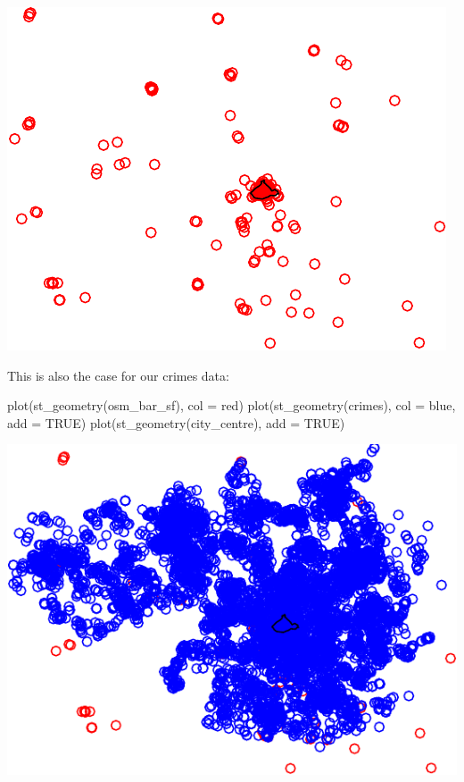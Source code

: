 \documentclass[
]{book}
\makeatletter
\newenvironment{Shaded}{\begin{snugshade}}{\end{snugshade}}
\newcommand{\AttributeTok}[1]{\textcolor[rgb]{0.61,0.61,0.61}{#1}}
\newcommand{\ConstantTok}[1]{\textcolor[rgb]{0,0,0}{#1}}
\newcommand{\FunctionTok}[1]{\textcolor[rgb]{0,0,0}{#1}}
\newcommand{\NormalTok}[1]{#1}
\newcommand{\StringTok}[1]{\textcolor[rgb]{0.5,0.5,0.5}{#1}}
\newenvironment{kframe}{%
\medskip{}
\setlength{\fboxsep}{.8em}
 \def\at@end@of@kframe{}%
 \ifinner\ifhmode%
  \def\at@end@of@kframe{\end{minipage}}%
  \begin{minipage}{\columnwidth}%
 \fi\fi%
 \def\FrameCommand##1{\hskip\@totalleftmargin \hskip-\fboxsep
 \colorbox{shadecolor}{##1}\hskip-\fboxsep
     \hskip-\linewidth \hskip-\@totalleftmargin \hskip\columnwidth}%
 \MakeFramed {\advance\hsize-\width
   \@totalleftmargin\z@ \linewidth\hsize
   \@setminipage}}%
 {\par\unskip\endMakeFramed%
 \at@end@of@kframe}
\renewenvironment{Shaded}{\begin{kframe}}{\end{kframe}}
\makeatother
\begin{document}
\includegraphics{crime_mapping_files/figure-latex/plot_bars-1.pdf}

This is also the case for our crimes data:

\begin{Shaded}
\begin{Highlighting}[]
\FunctionTok{plot}\NormalTok{(}\FunctionTok{st\_geometry}\NormalTok{(osm\_bar\_sf), }\AttributeTok{col =} \StringTok{\textquotesingle{}red\textquotesingle{}}\NormalTok{)}
\FunctionTok{plot}\NormalTok{(}\FunctionTok{st\_geometry}\NormalTok{(crimes), }\AttributeTok{col =} \StringTok{\textquotesingle{}blue\textquotesingle{}}\NormalTok{, }\AttributeTok{add =} \ConstantTok{TRUE}\NormalTok{)}
\FunctionTok{plot}\NormalTok{(}\FunctionTok{st\_geometry}\NormalTok{(city\_centre), }\AttributeTok{add =} \ConstantTok{TRUE}\NormalTok{)}
\end{Highlighting}
\end{Shaded}

\includegraphics{crime_mapping_files/figure-latex/plot_crimes-1.pdf}
\end{document}
